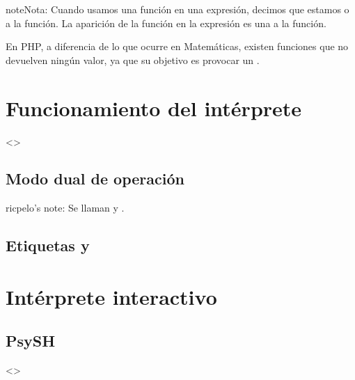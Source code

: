 \documentclass[a4paper,12pt,spanish]{sphinxmanual}
\begin{document}
\begin{sphinxadmonition}{note}{Nota:}
Cuando usamos una función en una expresión, decimos que estamos  o
 a la función. La aparición de la función en la expresión es una
 a la función.
\end{sphinxadmonition}

En PHP, a diferencia de lo que ocurre en Matemáticas, existen funciones que no
devuelven ningún valor, ya que su objetivo es provocar un .


\section{Funcionamiento del intérprete}
\label{\detokenize{php:funcionamiento-del-interprete}}
\textless{}\textgreater{}


\subsection{Modo dual de operación}
\label{\detokenize{php:modo-dual-de-operacion}}
ricpelo’s note: Se llaman  y .


\subsection{Etiquetas  y }
\label{\detokenize{php:etiquetas-php-y}}

\section{Intérprete interactivo}
\label{\detokenize{php:interprete-interactivo}}

\subsection{}
\label{\detokenize{php:php-a}}

\subsection{PsySH}
\label{\detokenize{php:psysh}}
\textless{}\textgreater{}
\end{document}
